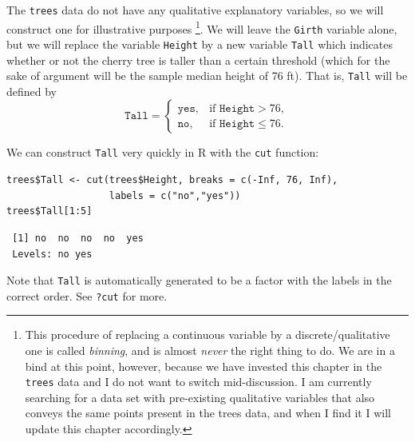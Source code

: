 \documentclass[captions=tableheading]{scrbook}
\begin{document}
\begin{note*}
The \texttt{trees} data do not have any qualitative explanatory variables, so we will construct one for illustrative purposes
\footnote{This procedure of replacing a continuous variable by a discrete/qualitative one is called \emph{binning}, and is almost \emph{never} the right thing to do. We are in a bind at this point, however, because we have invested this chapter in the \texttt{trees} data and I do not want to switch mid-discussion. I am currently searching for a data set with pre-existing qualitative variables that also conveys the same points present in the trees data, and when I find it I will update this chapter accordingly.}.
We will leave the \texttt{Girth} variable alone, but we will replace the variable \texttt{Height} by a new variable \texttt{Tall} which indicates whether or not the cherry tree is taller than a certain threshold (which for the sake of argument will be the sample median height of 76 ft). That is, \texttt{Tall} will be defined by
\begin{equation}
\mathtt{Tall}=
\begin{cases}
\mathtt{yes}, & \mbox{if }\mathtt{Height}>76,\\
\mathtt{no}, & \mbox{if }\mathtt{Height}\leq76.
\end{cases}
\end{equation}

We can construct \texttt{Tall} very quickly in \textsf{R} with the \texttt{cut} function:


\begin{verbatim}
trees$Tall <- cut(trees$Height, breaks = c(-Inf, 76, Inf), 
                  labels = c("no","yes"))
trees$Tall[1:5]
\end{verbatim}

\begin{verbatim}
 [1] no  no  no  no  yes
 Levels: no yes
\end{verbatim}

Note that \texttt{Tall} is automatically generated to be a factor with the labels in the correct order. See \texttt{?cut} for more. 
\end{note*}
\end{document}
